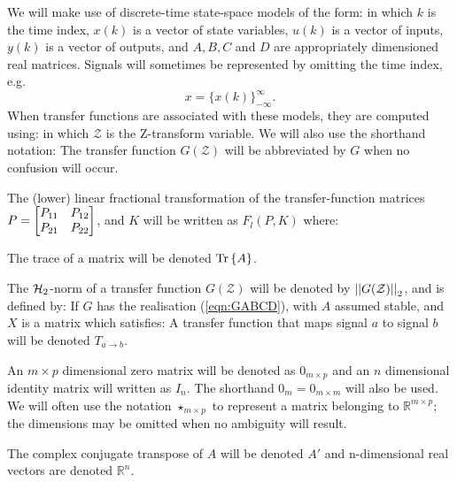 \label{sec:notation}
We will make use of discrete-time state-space models of the form:
in which $k$ is the time index, $x(k)$ is a vector of state variables, $u(k)$ is a vector of inputs, $y(k)$ is a vector of outputs, and $A,B,C$ and $D$ are appropriately dimensioned real matrices. Signals will sometimes be represented by omitting the time index, e.g.
$$x=\{x(k)\}^{\infty}_{-\infty}.$$
When transfer functions are associated with these models, they are computed using:
in which $\mathcal{Z}$ is the Z-transform variable. We will also use the shorthand notation:
The transfer function $G(\mathcal{Z})$ will be abbreviated by $G$ when no confusion will occur.

The (lower) linear fractional transformation of the transfer-function matrices $P=\begin{bmatrix} P_{11} &P_{12}\\P_{21} & P_{22} \end{bmatrix}$, and $K$ will be written as $F_l(P,K)$ where: 

The trace of a matrix will be denoted $\textrm{Tr}\left\{ A \right\}$.
 
The $\mathcal H_2$-norm of a transfer function $G(\mathcal{Z})$ will be denoted by $\left|\left| G(\mathcal{Z}) \right|\right|_2$, and is defined by:
If $G$ has the realisation (\ref{eqn:GABCD}), with $A$ assumed stable, and $X$ is a matrix which satisfies:
%
A transfer function that maps signal $a$ to signal $b$ will be denoted $T_{a\rightarrow b}$.

An $m\times p$ dimensional zero matrix will be denoted as $0_{m\times p}$ and an $n$ dimensional identity matrix will written as $I_n$. The shorthand $0_m=0_{m\times m}$ will also be used. We will often use the notation $\star_{m\times p}$ to represent a matrix belonging to $\mathbb R^{m\times p}$; the dimensions may be omitted when no ambiguity will result.

The complex conjugate transpose of $A$ will be denoted $A'$ and n-dimensional real vectors are denoted $\mathbb{R}^n$.


